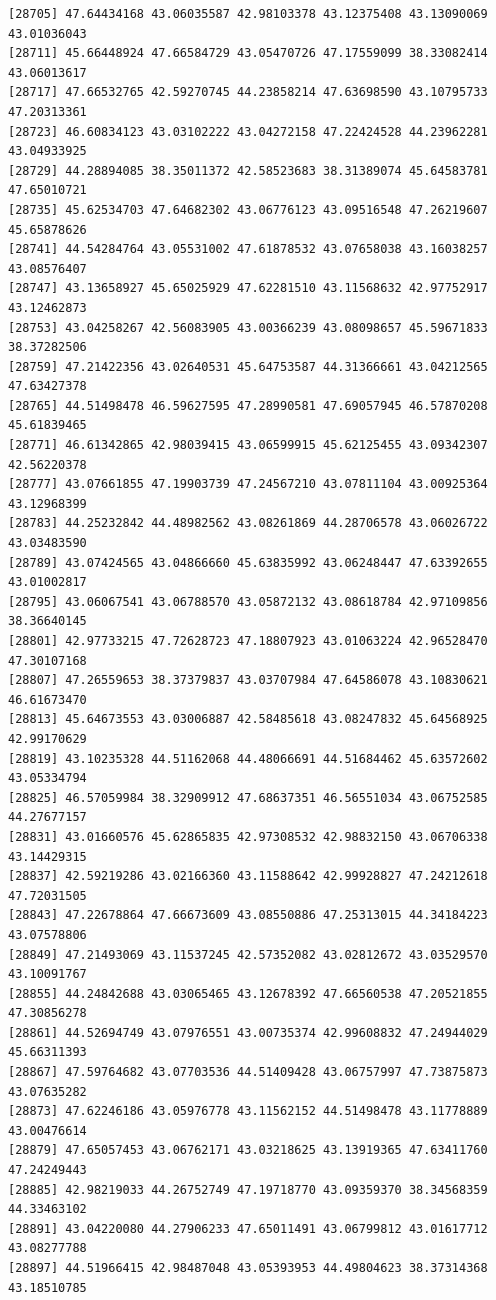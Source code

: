 \documentclass[
  letterpaper,
  DIV=11,
  numbers=noendperiod]{scrartcl}
\begin{document}
\begin{verbatim}
[28705] 47.64434168 43.06035587 42.98103378 43.12375408 43.13090069 43.01036043
[28711] 45.66448924 47.66584729 43.05470726 47.17559099 38.33082414 43.06013617
[28717] 47.66532765 42.59270745 44.23858214 47.63698590 43.10795733 47.20313361
[28723] 46.60834123 43.03102222 43.04272158 47.22424528 44.23962281 43.04933925
[28729] 44.28894085 38.35011372 42.58523683 38.31389074 45.64583781 47.65010721
[28735] 45.62534703 47.64682302 43.06776123 43.09516548 47.26219607 45.65878626
[28741] 44.54284764 43.05531002 47.61878532 43.07658038 43.16038257 43.08576407
[28747] 43.13658927 45.65025929 47.62281510 43.11568632 42.97752917 43.12462873
[28753] 43.04258267 42.56083905 43.00366239 43.08098657 45.59671833 38.37282506
[28759] 47.21422356 43.02640531 45.64753587 44.31366661 43.04212565 47.63427378
[28765] 44.51498478 46.59627595 47.28990581 47.69057945 46.57870208 45.61839465
[28771] 46.61342865 42.98039415 43.06599915 45.62125455 43.09342307 42.56220378
[28777] 43.07661855 47.19903739 47.24567210 43.07811104 43.00925364 43.12968399
[28783] 44.25232842 44.48982562 43.08261869 44.28706578 43.06026722 43.03483590
[28789] 43.07424565 43.04866660 45.63835992 43.06248447 47.63392655 43.01002817
[28795] 43.06067541 43.06788570 43.05872132 43.08618784 42.97109856 38.36640145
[28801] 42.97733215 47.72628723 47.18807923 43.01063224 42.96528470 47.30107168
[28807] 47.26559653 38.37379837 43.03707984 47.64586078 43.10830621 46.61673470
[28813] 45.64673553 43.03006887 42.58485618 43.08247832 45.64568925 42.99170629
[28819] 43.10235328 44.51162068 44.48066691 44.51684462 45.63572602 43.05334794
[28825] 46.57059984 38.32909912 47.68637351 46.56551034 43.06752585 44.27677157
[28831] 43.01660576 45.62865835 42.97308532 42.98832150 43.06706338 43.14429315
[28837] 42.59219286 43.02166360 43.11588642 42.99928827 47.24212618 47.72031505
[28843] 47.22678864 47.66673609 43.08550886 47.25313015 44.34184223 43.07578806
[28849] 47.21493069 43.11537245 42.57352082 43.02812672 43.03529570 43.10091767
[28855] 44.24842688 43.03065465 43.12678392 47.66560538 47.20521855 47.30856278
[28861] 44.52694749 43.07976551 43.00735374 42.99608832 47.24944029 45.66311393
[28867] 47.59764682 43.07703536 44.51409428 43.06757997 47.73875873 43.07635282
[28873] 47.62246186 43.05976778 43.11562152 44.51498478 43.11778889 43.00476614
[28879] 47.65057453 43.06762171 43.03218625 43.13919365 47.63411760 47.24249443
[28885] 42.98219033 44.26752749 47.19718770 43.09359370 38.34568359 44.33463102
[28891] 43.04220080 44.27906233 47.65011491 43.06799812 43.01617712 43.08277788
[28897] 44.51966415 42.98487048 43.05393953 44.49804623 38.37314368 43.18510785

\end{verbatim}
\end{document}

